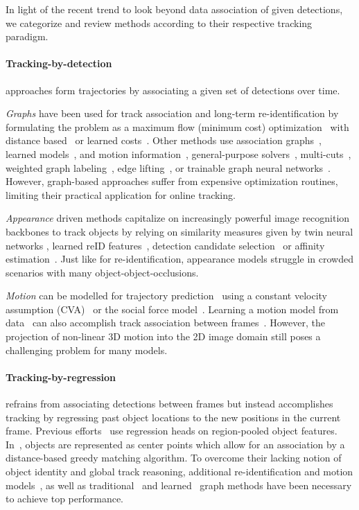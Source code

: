 \documentclass[10pt,twocolumn,letterpaper]{article}
\begin{document}
In light of the recent trend to look beyond data association of given detections, we categorize and review methods according to their respective tracking paradigm.

\paragraph{Tracking-by-detection} approaches form trajectories by associating a given set of detections over time.

\textit{Graphs} have been used for track association and long-term re-identification by formulating the problem as a maximum flow (minimum cost) optimization~\cite{berclaztpami2011} with distance based~\cite{jiangcvpr2007, pirsiavashcvpr2011, zhangcvpr2008} or learned costs~\cite{lealcvpr2014}.
Other methods use association graphs~\cite{eHAF}, learned models~\cite{MHT_DAM}, and motion information~\cite{jCC}, general-purpose solvers~\cite{yucvpr2007}, multi-cuts~\cite{TangAAS17}, weighted graph labeling~\cite{FWT}, edge lifting~\cite{lifted_disjoint_paths_2020_ICML}, or trainable graph neural networks~\cite{mot_neural_solver_2020_CVPR}.
However, graph-based approaches suffer from expensive optimization routines, limiting their practical application for online tracking.

\textit{Appearance} driven methods capitalize on increasingly powerful image recognition backbones to track objects by relying on similarity measures given by twin neural networks \cite{lealcvprw2016}, learned reID features~\cite{ristanicvpr2018}, detection candidate selection~\cite{MOTDT} or affinity estimation~\cite{famnet}.
Just like for re-identification, appearance models struggle in crowded scenarios with many object-object-occlusions.

\textit{Motion} can be modelled for trajectory prediction~\cite{lealiccv2011, alahicvpr2016, robicqueteccv2016} using a constant velocity assumption (CVA)~\cite{choieccv2010, andriyenkocvpr2011} or the social force model~\cite{scovannericcv2009, pellegriniiccv2009, yamaguchicvpr2011, lealiccv2011}.
Learning a motion model from data~\cite{lealcvpr2014} can also accomplish track association between frames~\cite{TT}.
However, the projection of non-linear 3D motion into the 2D image domain still poses a challenging problem for many models.

\paragraph{Tracking-by-regression} refrains from associating detections between frames but instead accomplishes tracking by regressing past object locations to the new positions in the current frame.
Previous efforts~\cite{feichtenhofer2017detect,tracktor} use regression heads on region-pooled object features.
In~\cite{center_track}, objects are represented as center points which allow for an association by a distance-based greedy matching algorithm.
To overcome their lacking notion of object identity and global track reasoning, additional re-identification and motion models~\cite{tracktor}, as well as traditional~\cite{GSM} and learned~\cite{mot_neural_solver_2020_CVPR} graph methods have been necessary to achieve top performance.
\end{document}
